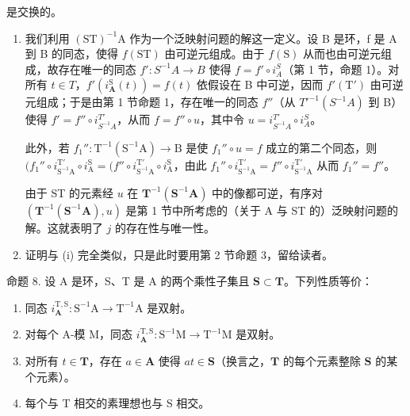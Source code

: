 是交换的。

\begin{enumerate}
\def\labelenumi{(\roman{enumi})}
\tightlist
\item
  我们利用 \((\mathrm{ST})^{-1}\mathrm{A}\) 作为一个泛映射问题的解这一定义。设 B 是环，f 是 A 到 B 的同态，使得 \(f(\mathrm{ST})\) 由可逆元组成。由于 \(f(\mathrm{S})\) 从而也由可逆元组成，故存在唯一的同态 \(f': S^{-1}A \to B\) 使得 \(f = f' \circ i_{A}^{S}\)（第 1 节，命题 1）。对所有 \(t \in T\)，\(f'(i_{\mathbf{A}}^{\mathrm{S}}(t)) = f(t)\) 依假设在 B 中可逆，因而 \(f'(\mathrm{T}')\) 由可逆元组成；于是由第 1 节命题 1，存在唯一的同态 \(f''\)（从 \(T'^{-1}(S^{-1}A)\) 到 B）使得 \(f' = f'' \circ i_{S^{-1}A}^{T'}\)，从而 \(f = f'' \circ u\)，其中令 \(u = i_{S^{-1}A}^{T'} \circ i_{A}^{S}\)。

此外，若 \(f_1'' \colon \mathrm{T}^{-1}(\mathrm{S}^{-1}\mathrm{A}) \to \mathrm{B}\) 是使 \(f_1'' \circ u = f\) 成立的第二个同态，则 \((f_1'' \circ i_{\mathrm{S}^{-1}\mathrm{A}}^{\mathrm{T}'} \circ i_{\mathrm{A}}^{\mathrm{S}} = (f'' \circ i_{\mathrm{S}^{-1}\mathrm{A}}^{\mathrm{T}'} \circ i_{\mathrm{A}}^{\mathrm{S}} \text{，由此 } f_1'' \circ i_{\mathrm{S}^{-1}\mathrm{A}}^{\mathrm{T}'} = f'' \circ i_{\mathrm{S}^{-1}\mathrm{A}}^{\mathrm{T}'} \text{ 从而 } f_1'' = f''\)。

由于 ST 的元素经 \(u\) 在 \(\mathbf{T}^{-1}(\mathbf{S}^{-1}\mathbf{A})\) 中的像都可逆，有序对 \((\mathbf{T}^{-1}(\mathbf{S}^{-1}\mathbf{A}), u)\) 是第 1 节中所考虑的（关于 A 与 ST 的）泛映射问题的解。这就表明了 \(j\) 的存在性与唯一性。

\item
  证明与 (i) 完全类似，只是此时要用第 2 节命题 3，留给读者。
\end{enumerate}

命题 8. 设 A 是环，S、T 是 A 的两个乘性子集且 \(\mathbf{S} \subset \mathbf{T}\)。下列性质等价：

\begin{enumerate}
\def\labelenumi{(\alph{enumi})}
\item
  同态 \(i_{\mathbf{A}}^{\mathrm{T},\mathrm{S}}: \mathrm{S}^{-1}\mathrm{A} \to \mathrm{T}^{-1}\mathrm{A}\) 是双射。
\item
  对每个 A-模 M，同态 \(i_{\mathbf{A}}^{\mathrm{T},\mathrm{S}}: \mathrm{S}^{-1}\mathrm{M} \to \mathrm{T}^{-1}\mathrm{M}\) 是双射。
\item
  对所有 \(t \in \mathbf{T}\)，存在 \(a \in \mathbf{A}\) 使得 \(at \in \mathbf{S}\)（换言之，\(\mathbf{T}\) 的每个元素整除 \(\mathbf{S}\) 的某个元素）。
\item
  每个与 T 相交的素理想也与 S 相交。
\end{enumerate}

